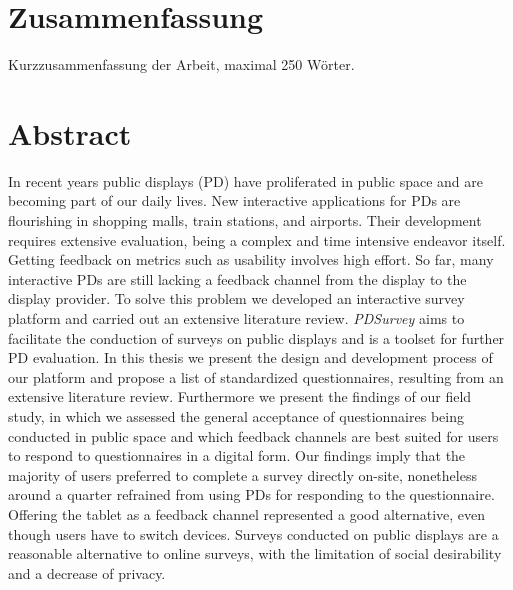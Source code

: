 
\section*{Zusammenfassung}

	Kurzzusammenfassung der Arbeit, maximal 250 W\"orter.

\section*{Abstract}

	In recent years public displays (PD) have proliferated in public space and are becoming part of our daily lives. New interactive applications for PDs are flourishing in shopping malls, train stations, and airports. Their development requires extensive evaluation, being a complex and time intensive endeavor itself. Getting feedback on metrics such as usability involves high effort. So far, many interactive PDs are still lacking a feedback channel from the display to the display provider. To solve this problem we developed an interactive survey platform and carried out an extensive literature review.
	\textit{PDSurvey} aims to facilitate the conduction of surveys on public displays and is a toolset for further PD evaluation. In this thesis we present the design and development process of our platform and propose a list of standardized questionnaires, resulting from an extensive literature review. Furthermore we present the findings of our field study, in which we assessed the general acceptance of questionnaires being conducted in public space and which feedback channels are best suited for users to respond to questionnaires in a digital form.
	Our findings imply that the majority of users preferred to complete a survey directly on-site, nonetheless around a quarter refrained from using PDs for responding to the questionnaire. Offering the tablet as a feedback channel represented a good alternative, even though users have to switch devices. 	Surveys conducted on public displays are a reasonable alternative to online surveys, with the limitation of social desirability and a decrease of privacy.
	








